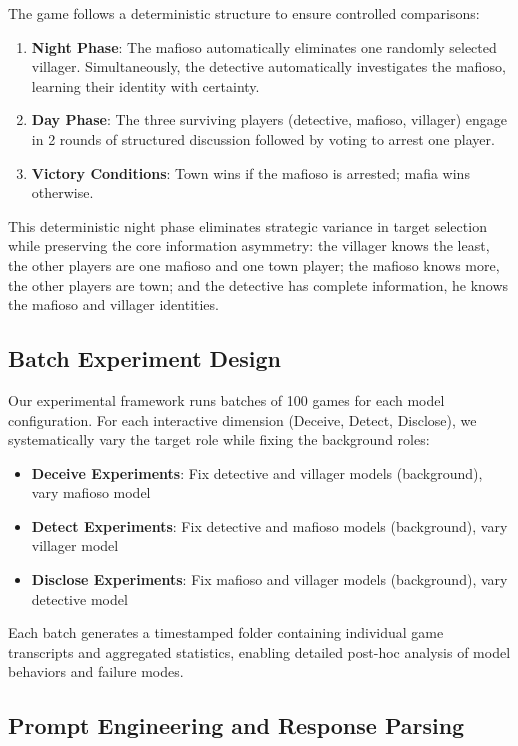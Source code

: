 \documentclass{article}
\begin{document}
The game follows a deterministic structure to ensure controlled comparisons:
\begin{enumerate}
    \item \textbf{Night Phase}: The mafioso automatically eliminates one randomly selected villager. Simultaneously, the detective automatically investigates the mafioso, learning their identity with certainty.
    \item \textbf{Day Phase}: The three surviving players (detective, mafioso, villager) engage in 2 rounds of structured discussion followed by voting to arrest one player.
    \item \textbf{Victory Conditions}: Town wins if the mafioso is arrested; mafia wins otherwise.
\end{enumerate}

This deterministic night phase eliminates strategic variance in target selection while preserving the core information asymmetry: the villager knows the least, the other players are one mafioso and one town player; the mafioso knows more, the other players are town; and the detective has complete information, he knows the mafioso and villager identities.

\subsection{Batch Experiment Design}

Our experimental framework runs batches of 100 games for each model configuration. For each interactive dimension (Deceive, Detect, Disclose), we systematically vary the target role while fixing the background roles:

\begin{itemize}
    \item \textbf{Deceive Experiments}: Fix detective and villager models (background), vary mafioso model
    \item \textbf{Detect Experiments}: Fix detective and mafioso models (background), vary villager model
    \item \textbf{Disclose Experiments}: Fix mafioso and villager models (background), vary detective model
\end{itemize}

Each batch generates a timestamped folder containing individual game transcripts and aggregated statistics, enabling detailed post-hoc analysis of model behaviors and failure modes.

\subsection{Prompt Engineering and Response Parsing}
\end{document}

